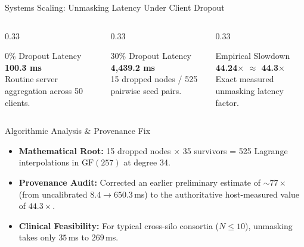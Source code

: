 \documentclass[aspectratio=169,10pt]{beamer}
\begin{document}
\begin{frame}{Systems Scaling: Unmasking Latency Under Client Dropout}
  \begin{columns}[T]
    \begin{column}{0.33\textwidth}
      \begin{block}{0\% Dropout Latency}
        \centering
        \vspace{0.2cm}
        {\Large \textbf{100.3 ms}}\\[0.1cm]
        \footnotesize Routine server aggregation across 50 clients.
      \end{block}
    \end{column}
    \begin{column}{0.33\textwidth}
      \begin{alertblock}{30\% Dropout Latency}
        \centering
        \vspace{0.2cm}
        {\Large \textbf{4,439.2 ms}}\\[0.1cm]
        \footnotesize 15 dropped nodes / 525 pairwise seed pairs.
      \end{alertblock}
    \end{column}
    \begin{column}{0.33\textwidth}
      \begin{exampleblock}{Empirical Slowdown}
        \centering
        \vspace{0.2cm}
        {\Large \textbf{44.24$\times$ $\approx$ 44.3$\times$}}\\[0.1cm]
        \footnotesize Exact measured unmasking latency factor.
      \end{exampleblock}
    \end{column}
  \end{columns}
  \vspace{0.2cm}
  \begin{block}{Algorithmic Analysis & Provenance Fix}
    \small
    \begin{itemize}[itemsep=3pt]
      \item \textbf{Mathematical Root:} 15 dropped nodes $\times$ 35 survivors = 525 Lagrange interpolations in $\text{GF}(257)$ at degree 34.
      \item \textbf{Provenance Audit:} Corrected an earlier preliminary estimate of $\sim 77\times$ (from uncalibrated $8.4 \to 650.3$\,ms) to the authoritative host-measured value of $\mathbf{44.3\times}$.
      \item \textbf{Clinical Feasibility:} For typical cross-silo consortia ($N \le 10$), unmasking takes only $35$\,ms to $269$\,ms.
    \end{itemize}
  \end{block}
\end{frame}
\end{document}
